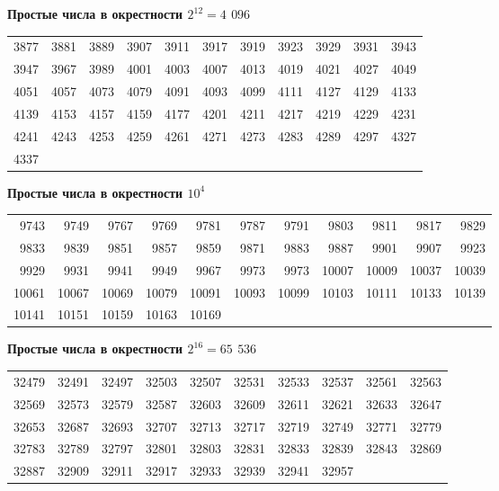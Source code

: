 \documentclass{mai_book}
\begin{document}
{ \begin{center}
 		{\large\textbf{Простые числа в окрестности $2^{12} = 4$ $096$}}
 \end{center}
 	\begin{tabular}{rrrrrrrrrrr}
3877 & 3881 & 3889 & 3907 & 3911 & 3917 & 3919 & 3923 & 3929 & 3931 & 3943 \\
3947 & 3967 & 3989 & 4001 & 4003 & 4007 & 4013 & 4019 & 4021 & 4027 & 4049 \\
4051 & 4057 & 4073 & 4079 & 4091 & 4093 & 4099 & 4111 & 4127 & 4129 & 4133 \\
4139 & 4153 & 4157 & 4159 & 4177 & 4201 & 4211 & 4217 & 4219 & 4229 & 4231 \\
4241 & 4243 & 4253 & 4259 & 4261 & 4271 & 4273 & 4283 & 4289 & 4297 & 4327 \\
4337
\end{tabular}

 \begin{center}
	{\large\textbf{Простые числа в окрестности $10^{4}$}}
\end{center}
\begin{tabular}{rrrrrrrrrrr}
	9743 & 9749 & 9767 & 9769 & 9781 & 9787 & 9791 & 9803 & 9811 & 9817 & 9829 \\
	9833 & 9839 & 9851 & 9857 & 9859 & 9871 & 9883 & 9887 & 9901 & 9907 & 9923 \\
	9929 & 9931 & 9941 & 9949 & 9967 & 9973 & 9973 & 10007 & 10009 & 10037 & 10039 \\ 
	10061 & 10067 & 10069 & 10079 & 10091 & 10093 & 10099 & 10103 & 10111 & 10133 & 10139 \\
	10141 & 10151 & 10159 & 10163 & 10169
\end{tabular}

 \begin{center}
	{\large\textbf{Простые числа в окрестности $2^{16} = 65$ $536$}}
\end{center}
\begin{tabular}{rrrrrrrrrr}
	32479 & 32491 & 32497 & 32503 & 32507 & 32531 & 32533 & 32537 & 32561 & 32563 \\
	32569 & 32573 & 32579 & 32587 & 32603 & 32609 & 32611 & 32621 & 32633 & 32647 \\
	32653 & 32687 & 32693 & 32707 & 32713 & 32717 & 32719 & 32749 & 32771 & 32779 \\
	32783 & 32789 & 32797 & 32801 & 32803 & 32831 & 32833 & 32839 & 32843 & 32869 \\
	32887 & 32909 & 32911 & 32917 & 32933 & 32939 & 32941 & 32957
\end{tabular}

}
\end{document}
